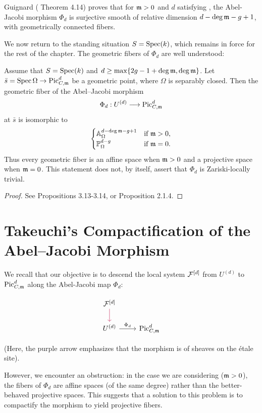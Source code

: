 Guignard (\cite{Guignard2018} Theorem 4.14) proves that for $\mdls > 0$ and $d$ satisfying , the Abel-Jacobi morphism $\Phi_d$ is 
surjective smooth of relative dimension $d - \deg \mdls - g + 1$, with geometrically connected fibers. 

We now return to the standing situation $S=\Spec(k)$, which remains in
force for the rest of the chapter. The geometric fibers of $\Phi_d$ are
well understood:
\begin{theorem}\label{theorem:abel-jacobi-fibers}
Assume that $S=\Spec(k)$ and
$d \geq \max\{2g-1+\deg\mdls,\deg\mdls\}$. Let
$\bar s=\Spec\Omega\to\PicCm[d]$ be a geometric point, where $\Omega$ is
separably closed. Then the geometric fiber of the Abel--Jacobi morphism
\[
    \Phi_d:U^{(d)}\longrightarrow\PicCm[d]
\]
at $\bar s$ is isomorphic to
$$
\begin{cases}
\mathbb{A}_{\Omega}^{d - \deg \mdls - g + 1} & \text{if } \mdls > 0, \\
\mathbb{P}_{\Omega}^{d - g} & \text{if } \mdls = 0.
\end{cases}
$$
Thus every geometric fiber is an affine space when $\mdls>0$ and a
projective space when $\mdls=0$. This statement does not, by itself,
assert that $\Phi_d$ is Zariski-locally trivial.
\end{theorem}
\begin{proof}
See \cite{tendler2015geometricclassfieldtheory} Propositions 3.13-3.14, or \cite{Toth2011} Proposition 2.1.4.    

\end{proof}

\section{Takeuchi's Compactification of the Abel--Jacobi Morphism}\label{section:BlowupOfSymmetricPowerOfCurves}
We recall that our objective is to descend the local system $\cF^{[d]}$ from $U^{(d)}$ to $\PicCm[d]$ along the 
Abel-Jacobi map $\Phi_d$:

\[
\begin{tikzcd}
 \cF^{[d]} \arrow[d, purple]\\
 U^{(d)} \arrow[r, "\Phi_d"] & \PicCm[d]      
\end{tikzcd}
\]


(Here, the purple arrow emphasizes that the morphism is of sheaves on the étale site).

However, we encounter an obstruction: in the case we are considering ($\mdls > 0$), 
the fibers of $\Phi_d$ are affine spaces (of the same degree) rather than the better-behaved projective spaces. 
This suggests that a solution to this problem is to compactify the morphism to yield projective fibers. 
 
